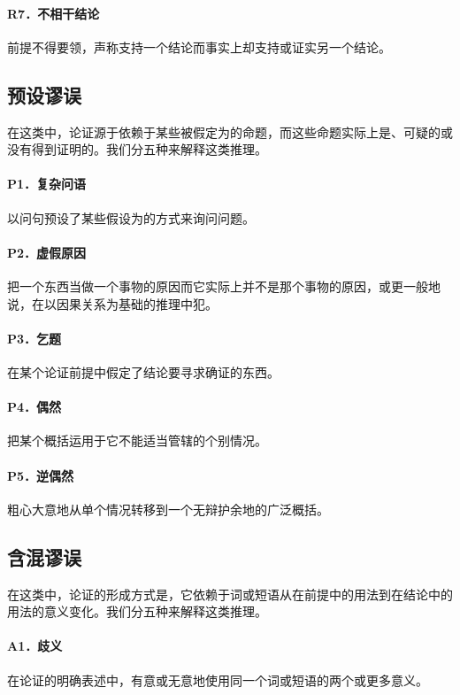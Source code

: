 \paragraph{R7．不相干结论}
前提不得要领，声称支持一个结论而事实上却支持或证实另一个结论。

\subsection*{预设谬误}
在这类中，论证源于依赖于某些被假定为的命题，而这些命题实际上是、可疑的或没有得到证明的。我们分五种来解释这类推理。

\paragraph{P1．复杂问语}
以问句预设了某些假设为的方式来询问问题。

\paragraph{P2．虚假原因}
把一个东西当做一个事物的原因而它实际上并不是那个事物的原因，或更一般地说，在以因果关系为基础的推理中犯。

\paragraph{P3．乞题}
在某个论证前提中假定了结论要寻求确证的东西。

\paragraph{P4．偶然}
把某个概括运用于它不能适当管辖的个别情况。

\paragraph{P5．逆偶然}
粗心大意地从单个情况转移到一个无辩护余地的广泛概括。

\subsection*{含混谬误}
在这类中，论证的形成方式是，它依赖于词或短语从在前提中的用法到在结论中的用法的意义变化。我们分五种来解释这类推理。

\paragraph{A1．歧义}
在论证的明确表述中，有意或无意地使用同一个词或短语的两个或更多意义。

